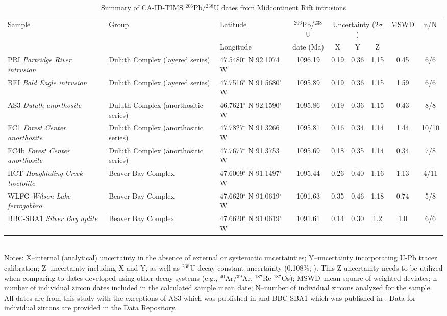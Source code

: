 \documentclass[11pt,letterpaper]{article}
\begin{document}
\begin{table}[h!]
\footnotesize
\caption{Summary of CA-ID-TIMS $^{206}$Pb/$^{238}$U dates from Midcontinent Rift intrusions}
\begin{tabular}{|p{3 cm}|p{3 cm}|p{1.8 cm}|c|ccc|c|c|}
\hline
Sample & Group & Latitude & $^{206}$Pb/$^{238}$U & \multicolumn{3}{|c|}{Uncertainty (2$\sigma$)} & MSWD & n/N \\
 &  & Longitude & date (Ma) & X & Y & Z & & \\
\hline
PRI \textit{Partridge River intrusion} & Duluth Complex (layered series) & 47.5480$^{\circ}$ N 92.1074$^{\circ}$ W & 1096.19 & 0.19 & 0.36 & 1.15 & 0.45 & 6/6 \\
\hline
BEI \textit{Bald Eagle intrusion} & Duluth Complex (layered series) & 47.7516$^{\circ}$ N 91.5680$^{\circ}$ W & 1095.89 & 0.19 & 0.36 & 1.15 & 1.59 & 6/6 \\
\hline
AS3 \textit{Duluth anorthosite} & Duluth Complex (anorthositic series) & 46.7621$^{\circ}$ N 92.1590$^{\circ}$ W & 1095.86 & 0.19 & 0.36 & 1.15 & 0.43 & 8/8 \\
\hline
FC1 \textit{Forest Center anorthosite} & Duluth Complex (anorthositic series) & 47.7827$^{\circ}$ N 91.3266$^{\circ}$ W & 1095.81 & 0.16 & 0.34 & 1.14 & 1.44 & 10/10 \\
\hline
FC4b \textit{Forest Center anorthosite} & Duluth Complex (anorthositic series) & 47.7677$^{\circ}$ N 91.3753$^{\circ}$ W & 1095.69 & 0.18 & 0.35 & 1.14 & 0.34 & 7/8 \\
\hline
HCT \textit{Houghtaling Creek troctolite} & Beaver Bay Complex & 47.6009$^{\circ}$ N 91.1497$^{\circ}$ W & 1095.44 & 0.26 & 0.40 & 1.16 & 1.13 & 4/11  \\
\hline
WLFG \textit{Wilson Lake ferrogabbro} & Beaver Bay Complex & 47.6620$^{\circ}$ N 91.0619$^{\circ}$ W & 1091.63 & 0.35 & 0.46 & 1.18 & 0.74 & 5/8 \\
\hline
BBC-SBA1 \textit{Silver Bay aplite} & Beaver Bay Complex & 47.6620$^{\circ}$ N 91.0619$^{\circ}$ W & 1091.61 & 0.14 & 0.30 & 1.2 & 1.0 & 6/6 \\
\hline
\end{tabular}\\
Notes: X--internal (analytical) uncertainty in the absence of external or systematic uncertainties; Y--uncertainty incorporating U-Pb tracer calibration; Z--uncertainty including X and Y, as well as $^{238}$U decay constant uncertainty (0.108$\%$; \citealp{Jaffey1971a}). This Z uncertainty needs to be utilized when comparing to dates developed using other decay systems (e.g., $^{40}$Ar/$^{39}$Ar, $^{187}$Re-$^{187}$Os); MSWD--mean square of weighted deviates; n--number of individual zircon dates included in the calculated sample mean date; N--number of individual zircons analyzed for the sample. All dates are from this study with the exceptions of AS3 which was published in \cite{Schoene2006a} and BBC-SBA1 which was published in \cite{Fairchild2017a}. Data for individual zircons are provided in the Data Repository.
\label{tab:geochron}
\end{table}
\end{document}

